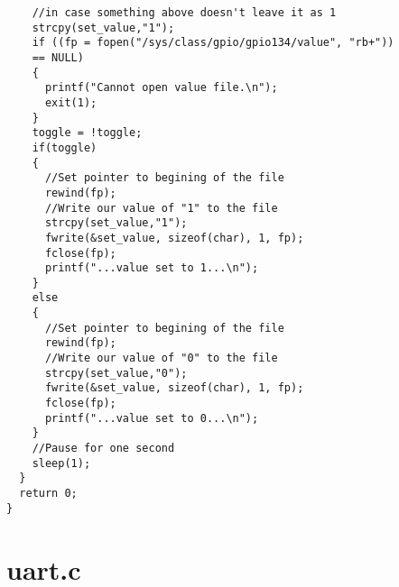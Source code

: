 \begin{verbatim}
    //in case something above doesn't leave it as 1
    strcpy(set_value,"1");
    if ((fp = fopen("/sys/class/gpio/gpio134/value", "rb+")) 
    == NULL)
    {
      printf("Cannot open value file.\n");
      exit(1);
    }
    toggle = !toggle;
    if(toggle)
    {
      //Set pointer to begining of the file
      rewind(fp);
      //Write our value of "1" to the file
      strcpy(set_value,"1");
      fwrite(&set_value, sizeof(char), 1, fp);
      fclose(fp);
      printf("...value set to 1...\n");
    }
    else
    {
      //Set pointer to begining of the file
      rewind(fp);
      //Write our value of "0" to the file
      strcpy(set_value,"0");
      fwrite(&set_value, sizeof(char), 1, fp);
      fclose(fp);
      printf("...value set to 0...\n");
    }
    //Pause for one second
    sleep(1);
  }
  return 0;
}
\end{verbatim}



\section{uart.c}\label{anx_sw_uart}

